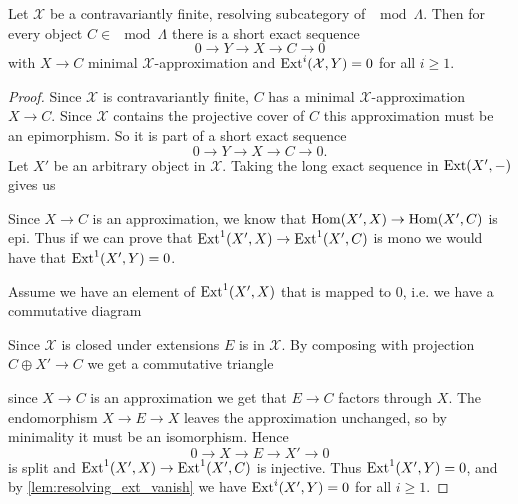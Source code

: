 \begin{lemma} \label{lem:exact_sequence_from_approximation}
	Let $\mathcal X$ be a contravariantly finite, resolving subcategory of $\mod \Lambda$. Then for every object $C \in \mod\Lambda$ there is a short exact sequence 
	$$0 \to Y \to X \to C \to 0$$ 
	with $X\to C$ minimal $\mathcal X$-approximation and $\operatorname{Ext}^i(\mathcal X, Y)=0$ for all $i \geq 1$.
	\begin{proof}
		Since $\mathcal X$ is contravariantly finite, $C$ has a minimal $\mathcal X$-approximation $X \to C$. Since $\mathcal X$ contains the projective cover of $C$ this approximation must be an epimorphism. So it is part of a short exact sequence $$0 \to Y \to X \to C \to 0.$$ Let $X'$ be an arbitrary object in $\mathcal X$. Taking the long exact sequence in $\operatorname{Ext}(X', -)$ gives us
		\begin{center}
		\end{center}
		Since $X \to C$ is an approximation, we know that $\operatorname{Hom}(X', X) \to \operatorname{Hom}(X', C)$ is epi. Thus if we can prove that $\operatorname{Ext}^1(X', X) \to \operatorname{Ext}^1(X', C)$ is mono we would have that $\operatorname{Ext}^1(X', Y)=0$. 
		
		Assume we have an element of $\operatorname{Ext}^1(X', X)$ that is mapped to 0, i.e. we have a commutative diagram
		\begin{center}
		\end{center}
		Since $\mathcal X$ is closed under extensions $E$ is in $\mathcal X$. By composing with projection $C\oplus X' \to C$ we get a commutative triangle
		\begin{center}
		\end{center}
		since $X \to C$ is an approximation we get that $E \to C$ factors through $X$. The endomorphism $X \to E \to X$ leaves the approximation unchanged, so by minimality it must be an isomorphism. Hence 
		$$0 \to X \to E \to X' \to 0$$
		 is split and $\operatorname{Ext}^1(X', X) \to \operatorname{Ext}^1(X', C)$ is injective. Thus $\operatorname{Ext}^1(X', Y)=0$, and by \cref{lem:resolving_ext_vanish} we have $\operatorname{Ext}^i(X', Y)=0$ for all $i\geq 1$.
	\end{proof}
\end{lemma}


